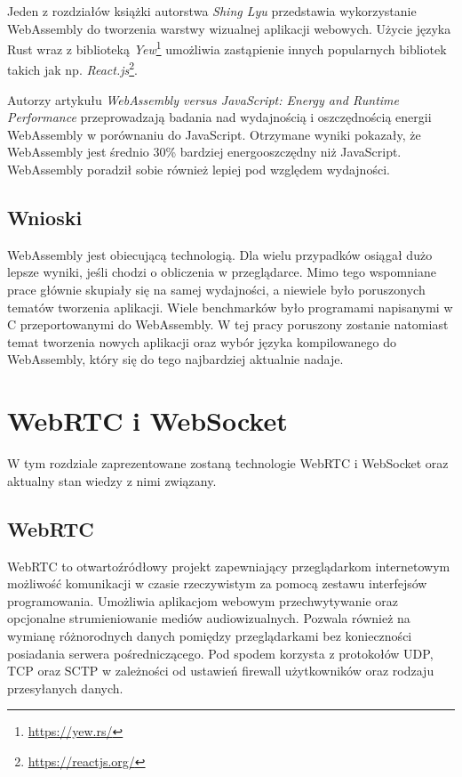 \documentclass[language=polish,type=master]{aghmodern}
\begin{document}
Jeden z rozdziałów książki \cite{wasm_yew} autorstwa \emph{Shing Lyu} przedstawia wykorzystanie WebAssembly do tworzenia warstwy wizualnej aplikacji webowych.
Użycie języka Rust wraz z biblioteką \emph{Yew}\footnote{\url{https://yew.rs/}} umożliwia zastąpienie innych popularnych bibliotek takich jak np. \emph{React.js}\footnote{\url{https://reactjs.org/}}.

Autorzy artykułu \cite{wasm_energy} \emph{WebAssembly versus JavaScript: Energy and Runtime Performance} przeprowadzają badania nad wydajnością i oszczędnością energii WebAssembly w porównaniu do JavaScript.
Otrzymane wyniki pokazały, że WebAssembly jest średnio 30\% bardziej energooszczędny niż JavaScript.
WebAssembly poradził sobie również lepiej pod względem wydajności.

\section{Wnioski}
WebAssembly jest obiecującą technologią.
Dla wielu przypadków osiągał dużo lepsze wyniki, jeśli chodzi o obliczenia w przeglądarce.
Mimo tego wspomniane prace głównie skupiały się na samej wydajności, a niewiele było poruszonych tematów tworzenia aplikacji.
Wiele benchmarków było programami napisanymi w C przeportowanymi\footnotemark{} do WebAssembly.
W tej pracy poruszony zostanie natomiast temat tworzenia nowych aplikacji oraz wybór języka kompilowanego do WebAssembly, który się do tego najbardziej aktualnie nadaje.

\chapter{WebRTC i WebSocket}
W tym rozdziale zaprezentowane zostaną technologie WebRTC i WebSocket oraz aktualny stan wiedzy z nimi związany.

\section{WebRTC}
WebRTC to otwartoźródłowy projekt zapewniający przeglądarkom internetowym możliwość komunikacji w czasie rzeczywistym za pomocą zestawu interfejsów programowania.
Umożliwia aplikacjom webowym przechwytywanie oraz opcjonalne strumieniowanie mediów audiowizualnych.
Pozwala również na wymianę różnorodnych danych pomiędzy przeglądarkami bez konieczności posiadania serwera pośredniczącego.
Pod spodem korzysta z protokołów UDP, TCP oraz SCTP w zależności od ustawień firewall użytkowników oraz rodzaju przesyłanych danych.
\end{document}
